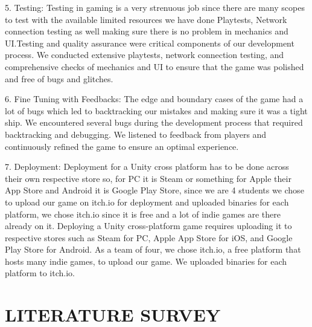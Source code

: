 \documentclass[12pt]{report}
\begin{document}
5.	Testing: Testing in gaming is a very strenuous job since there are many scopes to test with the available limited resources we have done Playtests, Network connection testing as well making sure there is no problem in mechanics and UI.Testing and quality assurance were critical components of our development process. We conducted extensive playtests, network connection testing, and comprehensive checks of mechanics and UI to ensure that the game was polished and free of bugs and glitches.

6.	Fine Tuning with Feedbacks: The edge and boundary cases of the game had a lot of bugs which led to backtracking our mistakes and making sure it was a tight ship. We encountered several bugs during the development process that required backtracking and debugging. We listened to feedback from players and continuously refined the game to ensure an optimal experience.

7.	Deployment: Deployment for a Unity cross platform has to be done across their own respective store so, for PC it is Steam or something for Apple their App Store and Android it is Google Play Store, since we are 4 students we chose to upload our game on itch.io for deployment and uploaded binaries for each platform, we chose itch.io since it is free and a lot of indie games are there already on it. Deploying a Unity cross-platform game requires uploading it to respective stores such as Steam for PC, Apple App Store for iOS, and Google Play Store for Android. As a team of four, we chose itch.io, a free platform that hosts many indie games, to upload our game. We uploaded binaries for each platform to itch.io.





\centering
\section{LITERATURE SURVEY}
\end{document}
